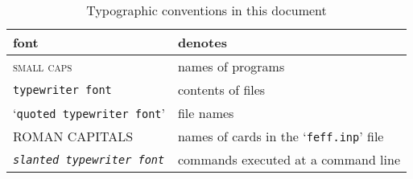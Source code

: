 \documentclass[11pt,oneside]{report} %
\newcommand{\program}[1]{\textsc{#1}}
\newcommand{\file}[1]{`\texttt{#1}'}
\begin{document}
\begin{latexonly}
{}
\begin{table}[htbp]
  \caption{Typographic conventions in this document}
  \label{tab:typographic}
  \begin{center}
    \begin{tabular}[h]{ll}
      \hline\hline
      \quad font & \quad denotes \\
      \hline
      \program{small caps} & names of programs\\
      \texttt{typewriter font} &  contents of files\\
      \file{quoted typewriter font} & file names\\
      ROMAN CAPITALS & names of cards in the \file{feff.inp} file\\
      \texttt{\textsl{slanted typewriter font}} &
      commands executed at a command line \\
      \hline\hline
    \end{tabular}
  \end{center}
\end{table}
\end{latexonly} %











%
\end{document}
